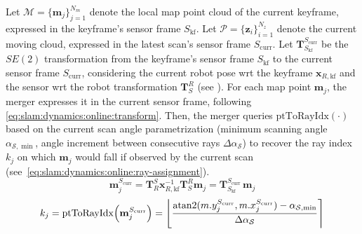 Let $\mathcal{M} = \{\mathbf{m}_j\}_{j=1}^{N_m}$ denote the local map point
cloud of the current keyframe, expressed in the keyframe's sensor frame
$S_{\mathrm{kf}}$. Let $\mathcal{P} = \{\mathbf{z}_i\}_{i=1}^{N_z}$ denote
the current moving cloud, expressed in the latest scan's sensor frame
$S_{\mathrm{curr}}$. Let $\mathbf{T}_{S_{\mathrm{kf}}}^{S_{\mathrm{curr}}}$ be
the $SE(2)$ transformation from the keyframe's sensor frame $S_{\mathrm{kf}}$ to
the current sensor frame $S_{\mathrm{curr}}$, considering
the current robot pose \gls{wrt} the keyframe $\mathbf{x}_{R,\mathrm{kf}}$ and
the sensor \gls{wrt} the robot transformation $\mathbf{T}_S^R$
(see ).
For each map point $\mathbf{m}_j$, the merger expresses it in the current
sensor frame, following \eqref{eq:slam:dynamics:online:transform}.
Then, the merger queries $\mathrm{ptToRayIdx}(\cdot)$ based on the current scan
angle parametrization (minimum scanning angle $\alpha_{\mathcal{S},\min}$,
angle increment between consecutive rays $\Delta\alpha_{\mathcal{S}}$) to
recover the ray index $k_j$ on which $\mathbf{m}_j$ would fall if observed by
the current scan (see~\eqref{eq:slam:dynamics:online:ray-assignment}).
\begin{equation}
\label{eq:slam:dynamics:online:transform}
\mathbf{m}_j^{S_{\mathrm{curr}}} =
\mathbf{T}_R^S
\mathbf{x}_{R,\mathrm{kf}}^{-1}
\mathbf{T}_S^R
\mathbf{m}_j =
\mathbf{T}_{S_{\mathrm{kf}}}^{S_{\mathrm{curr}}}\,\mathbf{m}_j
\end{equation}
\begin{equation}
\label{eq:slam:dynamics:online:ray-assignment}
k_j = \mathrm{ptToRayIdx}\!\left(\mathbf{m}_j^{S_{\mathrm{curr}}}\right) =
\left\lfloor
  \frac{\atan2( m.y_j^{S_{\mathrm{curr}}} , m.x_j^{S_{\mathrm{curr}}} ) -
        \alpha_{\mathcal{S},\min}}{\Delta\alpha_{\mathcal{S}}}
\right\rceil
\end{equation}

